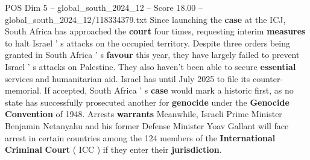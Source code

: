 \begin{textsample}{POS Dim 5 – global\_south\_2024\_12 – Score 18.00 – global\_south\_2024\_12/118334379.txt}
Since launching the \textbf{case} at the ICJ, South Africa has approached the \textbf{court} four times, requesting interim \textbf{measures} to halt Israel ' s attacks on the occupied territory.
Despite three orders being granted in South Africa ' s \textbf{favour} this year, they have largely failed to prevent Israel ' s attacks on Palestine.
They also haven't been able to secure \textbf{essential} services and humanitarian aid.
Israel has until July 2025 to file its counter-memorial.
If accepted, South Africa ' s \textbf{case} would mark a historic first, as no state has successfully prosecuted another for \textbf{genocide} under the \textbf{Genocide} \textbf{Convention} of 1948.
Arrests \textbf{warrants} Meanwhile, Israeli Prime Minister Benjamin Netanyahu and his former Defense Minister Yoav Gallant will face arrest in certain countries among the 124 members of the \textbf{International} \textbf{Criminal} \textbf{Court} ( ICC ) if they enter their \textbf{jurisdiction}.

\end{textsample}
